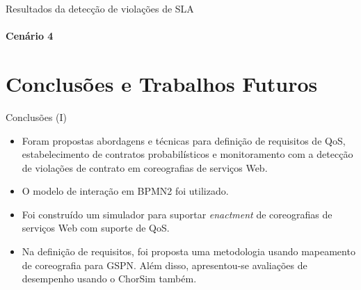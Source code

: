 \documentclass[xcolor=svgnames]{beamer}
\begin{document}
  \begin{frame}{Resultados da detecção de violações de SLA }  
	\framesubtitle{Cenário \textbf{4}}    
    \end{frame}
    


\section{Conclusões e Trabalhos Futuros}
  \begin{frame}{Conclusões (I)}
      \begin{itemize}
	\item Foram propostas  abordagens e técnicas para definição de requisitos de QoS, estabelecimento de contratos probabilísticos
	e monitoramento com a detecção de violações de contrato em coreografias de serviços Web.
	\item O modelo de interação em BPMN2 foi utilizado.
	\item Foi construído um simulador para suportar \textit{enactment} de coreografias de serviços Web com suporte de QoS.
	\item Na definição de requisitos, foi proposta uma metodologia usando mapeamento de coreografia para GSPN. Além disso, 
	apresentou-se avaliações de desempenho usando o ChorSim também.
      \end{itemize}

  \end{frame}
\end{document}
